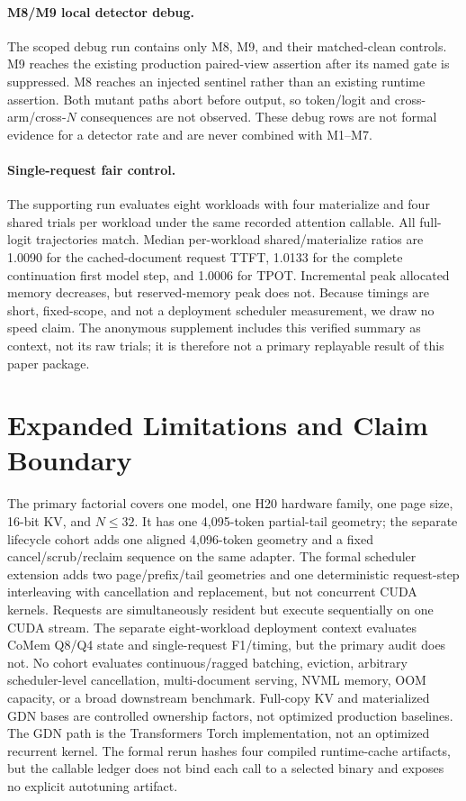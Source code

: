 \documentclass{article}
\begin{document}
\paragraph{M8/M9 local detector debug.}
The scoped debug run contains only M8, M9, and their matched-clean controls.
M9 reaches the existing production paired-view assertion after its named gate
is suppressed.  M8 reaches an injected sentinel rather than an existing
runtime assertion.  Both mutant paths abort before output, so token/logit and
cross-arm/cross-$N$ consequences are not observed.  These debug rows are not
formal evidence for a detector rate and are never combined with M1--M7.

\paragraph{Single-request fair control.}
The supporting run evaluates eight workloads with four materialize and four
shared trials per workload under the same recorded attention callable.  All
full-logit trajectories match.  Median per-workload shared/materialize ratios are 1.0090 for the
cached-document request TTFT, 1.0133 for the complete continuation first model
step, and 1.0006 for TPOT.  Incremental peak allocated memory decreases, but
reserved-memory peak does not.  Because timings are short, fixed-scope, and not
a deployment scheduler measurement, we draw no speed claim.  The anonymous
supplement includes this verified summary as context, not its raw trials; it is
therefore not a primary replayable result of this paper package.

\section{Expanded Limitations and Claim Boundary}
\label{app:expanded-limitations}

The primary factorial covers one model, one H20 hardware family, one page
size, 16-bit KV, and $N\leq32$.  It has one 4,095-token partial-tail geometry;
the separate lifecycle cohort adds one aligned 4,096-token geometry and a
fixed cancel/scrub/reclaim sequence on the same adapter.  The formal scheduler
extension adds two page/prefix/tail geometries and one deterministic
request-step interleaving with cancellation and replacement, but not concurrent
CUDA kernels.  Requests are simultaneously resident but execute sequentially
on one CUDA stream.  The
separate eight-workload deployment context evaluates CoMem Q8/Q4 state and
single-request F1/timing, but the primary audit does not.  No cohort evaluates
continuous/ragged batching, eviction, arbitrary scheduler-level cancellation,
multi-document serving,
NVML memory, OOM capacity, or a broad downstream benchmark.  Full-copy
KV and materialized GDN bases are controlled ownership factors, not optimized
production baselines.  The GDN path is the Transformers Torch implementation,
not an optimized recurrent kernel.  The formal rerun hashes four compiled
runtime-cache artifacts, but the callable ledger does not bind each call to a
selected binary and exposes no explicit autotuning artifact.
\end{document}
